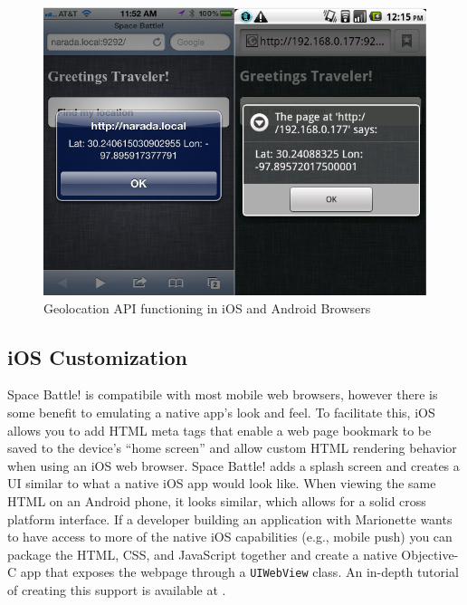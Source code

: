 \documentclass[12pt]{report}	%
\theoremstyle{definition}
\theoremstyle{remark}
\begin{document}
\begin{figure}[h!]
\centering
\includegraphics[scale=0.6]{1.png}
\caption{Geolocation API functioning in iOS and Android Browsers}
\label{geoloc}
\end{figure}

\subsection{iOS Customization}

Space Battle! is compatibile with most mobile web browsers, however there is 
some benefit to emulating a native app's look and feel. To facilitate this, 
iOS allows you to add HTML meta tags that enable
a web page bookmark to be saved to the device's ``home screen'' and allow 
custom HTML rendering behavior when using an iOS web browser. Space Battle! adds a splash
screen and creates a UI similar to what a native iOS app would look
like. When viewing the same HTML on an Android phone, it looks similar,
which allows for a solid cross platform interface. If a developer building 
an application with Marionette wants to have
access to more of the native iOS capabilities (e.g., mobile push) you can
package the HTML, CSS, and JavaScript together and create a native
Objective-C app that exposes the webpage through a
\texttt{UIWebView} class. An in-depth tutorial of
creating this support is available at \cite{mightios}.
\end{document}
